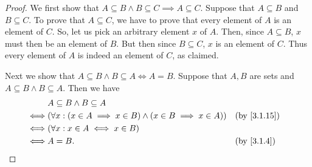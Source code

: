 \begin{proof}
  We first show that \(A \subseteq B \land B \subseteq C \implies A \subseteq C\).
  Suppose that \(A \subseteq B\) and \(B \subseteq C\).
  To prove that \(A \subseteq C\), we have to prove that every element of \(A\) is an element of \(C\).
  So, let us pick an arbitrary element \(x\) of \(A\).
  Then, since \(A \subseteq B\), \(x\) must then be an element of \(B\).
  But then since \(B \subseteq C\), \(x\) is an element of \(C\).
  Thus every element of \(A\) is indeed an element of \(C\), as claimed.

  Next we show that \(A \subseteq B \land B \subseteq A \iff A = B\).
  Suppose that \(A, B\) are sets and \(A \subseteq B \land B \subseteq A\).
  Then we have
  \begin{align*}
         & A \subseteq B \land B \subseteq A                                                                        \\
    \iff & (\forall x : (x \in A \implies x \in B) \land (x \in B \implies x \in A)) &  & \text{(by \cref{3.1.15})} \\
    \iff & (\forall x : x \in A \iff x \in B)                                                                       \\
    \iff & A = B.                                                                    &  & \by{3.1.4}
  \end{align*}


\end{proof}
